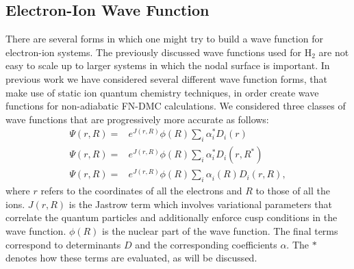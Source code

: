 \documentclass[aip,jcp,numerical,reprint]{revtex4-1}
\begin{document}
\subsection{Electron-Ion Wave Function}
 There are several forms in which one might try to build a wave function for electron-ion systems.  The previously discussed wave functions used for H$_{2}$ are not easy to scale up to larger systems in which the nodal surface is important.   %
In previous work we have considered several different wave function forms, that make use of static ion quantum chemistry techniques, in order create wave functions for non-adiabatic FN-DMC calculations. 
We considered three classes of wave functions that are progressively more accurate as follows:
\begin{align}
\Psi(r,R) =& e^{J(r,R)}\phi(R)\sum_{i}\alpha^{*}_{i} D_{i}(r) \label{eqn:wfs1}\\
\Psi(r,R) =&e^{J(r,R)}\phi(R)\sum_{i}\alpha^{*}_{i} D_{i}(r,R^{*}) \label{eqn:wfs2}\\
\Psi(r,R) =& e^{J(r,R)}\phi(R)\sum_{i}\alpha^{}_{i}(R) D_{i}(r,R), \label{eqn:wfs3}
\end{align}
where $r$ refers to the coordinates of all the electrons and $R$ to those of all the ions.  $J(r,R)$ is the Jastrow term which involves variational parameters that correlate the quantum particles and additionally  enforce cusp conditions in the wave function.  $\phi(R)$ is the nuclear part of the wave function. The final terms correspond to determinants $D$ and the corresponding coefficients $\alpha$.    The $*$ denotes how these terms are evaluated, as will be discussed. 
\end{document}

